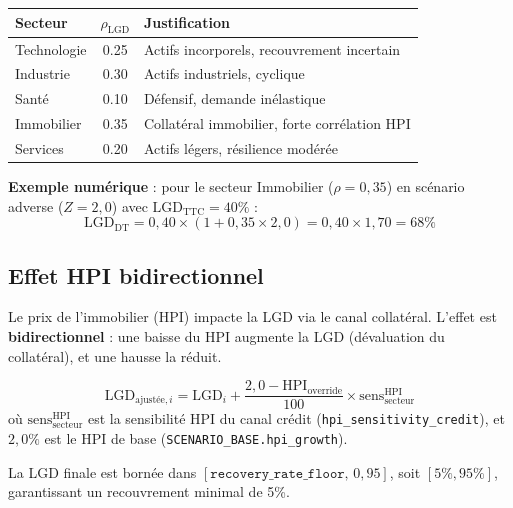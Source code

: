 \documentclass[12pt,a4paper]{article}
\begin{document}
\begin{center}
\begin{tabular}{lcl}
\toprule
\textbf{Secteur} & $\rho_{\text{LGD}}$ & \textbf{Justification} \\
\midrule
Technologie & 0.25 & Actifs incorporels, recouvrement incertain \\
Industrie   & 0.30 & Actifs industriels, cyclique \\
Sant\'e     & 0.10 & D\'efensif, demande in\'elastique \\
Immobilier  & 0.35 & Collat\'eral immobilier, forte corr\'elation HPI \\
Services    & 0.20 & Actifs l\'egers, r\'esilience mod\'er\'ee \\
\bottomrule
\end{tabular}
\end{center}

\textbf{Exemple num\'erique} : pour le secteur Immobilier ($\rho = 0{,}35$) en sc\'enario adverse ($Z = 2{,}0$) avec $\text{LGD}_{\text{TTC}} = 40\%$ :
\[
\text{LGD}_{\text{DT}} = 0{,}40 \times (1 + 0{,}35 \times 2{,}0) = 0{,}40 \times 1{,}70 = 68\%
\]

\subsection{Effet HPI bidirectionnel}

Le prix de l'immobilier (HPI) impacte la LGD via le canal collat\'eral. L'effet est \textbf{bidirectionnel} : une baisse du HPI augmente la LGD (d\'evaluation du collat\'eral), et une hausse la r\'eduit.

\begin{formulebox}
\begin{equation}
\label{eq:lgd_hpi}
\text{LGD}_{\text{ajust\'ee},i} = \text{LGD}_i + \frac{2{,}0 - \text{HPI}_{\text{override}}}{100} \times \text{sens}^{\text{HPI}}_{\text{secteur}}
\end{equation}
o\`u $\text{sens}^{\text{HPI}}_{\text{secteur}}$ est la sensibilit\'e HPI du canal cr\'edit (\texttt{hpi\_sensitivity\_credit}), et $2{,}0\%$ est le HPI de base (\texttt{SCENARIO\_BASE.hpi\_growth}).
\end{formulebox}

La LGD finale est born\'ee dans $[\texttt{recovery\_rate\_floor},\, 0{,}95]$, soit $[5\%, 95\%]$, garantissant un recouvrement minimal de 5\%.

\newpage
\end{document}
